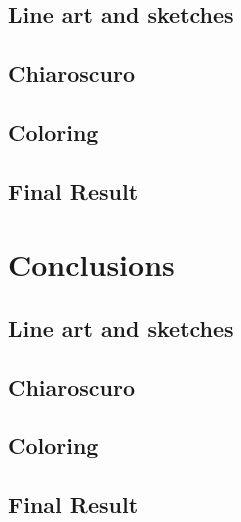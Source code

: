 \documentclass{cup-pan}
\begin{document}
    \subsection{Line art and sketches}

    \subsection{Chiaroscuro}

    \subsection{Coloring}

    \subsection{Final Result}
    \newpage
\newpage
\section{Conclusions}

    \subsection{Line art and sketches}

    \subsection{Chiaroscuro}

    \subsection{Coloring}

    \subsection{Final Result}
\newpage
\end{document}
